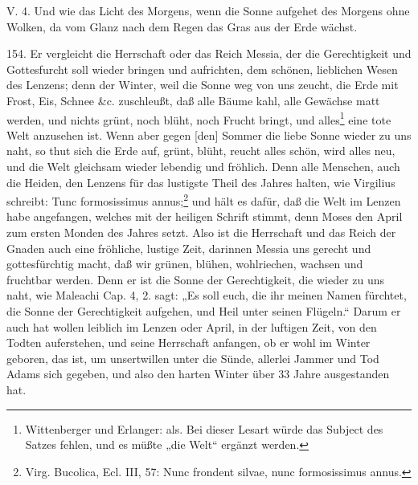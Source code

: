 \begin{schriftzitat}
V. 4. Und wie das Licht des Morgens, wenn die Sonne aufgehet des Morgens ohne Wolken, da vom Glanz nach dem Regen das Gras aus der Erde wächst.
\end{schriftzitat}

154. Er vergleicht die Herrschaft oder das Reich Messia, der die Gerechtigkeit und Gottesfurcht soll wieder bringen und aufrichten, dem schönen, lieblichen Wesen des Lenzens; denn der Winter, weil die Sonne weg von uns zeucht, die Erde mit Frost, Eis, Schnee \&c. zuschleußt, daß alle Bäume kahl, alle Gewächse matt werden, und nichts grünt, noch blüht, noch Frucht bringt, und alles\footnote{Wittenberger und Erlanger: als. Bei dieser Lesart würde das Subject des Satzes fehlen, und es müßte „die Welt“ ergänzt werden.} eine tote Welt anzusehen ist. Wenn aber gegen [den] Sommer die liebe Sonne wieder zu uns naht, so thut sich die Erde auf, grünt, blüht, reucht alles schön, wird alles neu, und die Welt gleichsam wieder lebendig und fröhlich. Denn alle Menschen, auch die Heiden, den Lenzens für das lustigste Theil des Jahres halten, wie Virgilius schreibt: Tunc formosissimus annus;\footnote{Virg. Bucolica, Ecl. III, 57: Nunc frondent silvae, nunc formosissimus annus.} und hält es dafür, daß die Welt
im Lenzen habe angefangen, welches mit der heiligen Schrift stimmt, denn Moses den April zum ersten Monden des Jahres setzt. Also ist die Herrschaft und das Reich der Gnaden auch eine fröhliche, lustige Zeit, darinnen Messia uns gerecht und gottesfürchtig macht, daß wir grünen, blühen, wohlriechen, wachsen und fruchtbar werden. Denn er ist die Sonne der Gerechtigkeit, die wieder zu uns naht, wie Maleachi Cap. 4, 2. sagt: „Es soll euch, die ihr meinen Namen fürchtet, die Sonne der Gerechtigkeit aufgehen, und Heil unter seinen Flügeln.“ Darum er auch hat wollen leiblich im Lenzen oder April, in der luftigen Zeit, von den Todten auferstehen, und seine Herrschaft anfangen, ob er wohl im Winter geboren, das ist, um unsertwillen unter die Sünde, allerlei Jammer und Tod Adams sich gegeben, und also den harten Winter über 33 Jahre ausgestanden hat.

